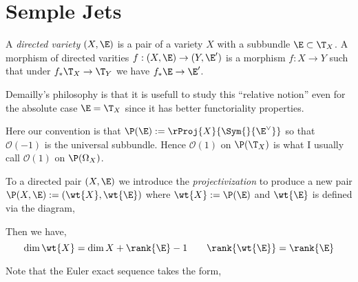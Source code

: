 \documentclass[12pt]{article}
\newcommand{\cO}{\mathcal{O}}
\begin{document}
\section{Semple Jets}


\begin{defn}
A \textit{directed variety} $(X, \E)$ is a pair of a variety $X$ with a subbundle $\E \subset \T_X$. A morphism of directed varities $f : (X, \E) \to (Y, \E')$ is a morphism $f : X \to Y$ such that under $f_* \T_X \to \T_Y$ we have $f_* \E \to \E'$.
\end{defn}

\begin{rmk}
Demailly's philosophy is that it is usefull to study this ``relative notion'' even for the absolute case $\E = \T_X$ since it has better functoriality properties.
\end{rmk}

\begin{rmk}
Here our convention is that $\P(\E) := \rProj{X}{\Sym{}{\E^\vee}}$ so that $\cO(-1)$ is the universal subbundle. Hence $\cO(1)$ on $\P(\T_X)$ is what I usually call $\cO(1)$ on $\P(\Omega_X)$.
\end{rmk}

\begin{defn}
To a directed pair $(X, \E)$ we introduce the \textit{projectivization} to produce a new pair $\P(X, \E) := (\wt{X}, \wt{\E})$ where $\wt{X} := \P(\E)$ and $\wt{\E}$ is defined via the diagram,
\begin{center}
\end{center}
Then we have,
\[ \dim{\wt{X}} = \dim{X} + \rank{\E} - 1 \quad \quad \rank{\wt{\E}} = \rank{\E} \] 
\end{defn}

\begin{rmk}
Note that the Euler exact sequence takes the form,
\begin{center}
\end{center}
\end{rmk}
\end{document}
